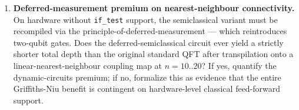 \begin{enumerate}
\item[\textbf{Q5.}]\textbf{Deferred-measurement premium on nearest-neighbour connectivity.}
On hardware without \texttt{if\_test} support, the semiclassical variant
must be recompiled via the principle-of-deferred-measurement --- which
reintroduces two-qubit gates. Does the deferred-semiclassical circuit ever
yield a strictly shorter total depth than the original standard QFT after
transpilation onto a linear-nearest-neighbour coupling map at $n{=}10..20$?
If yes, quantify the dynamic-circuits premium; if no, formalize this as
evidence that the entire Griffiths-Niu benefit is contingent on
hardware-level classical feed-forward support.
\end{enumerate}
